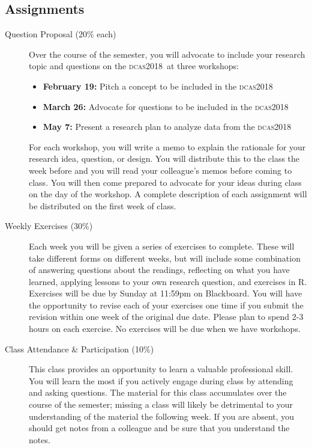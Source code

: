 \documentclass[11pt]{syllabus}
\newcommand{\R}{\textsf{R}}
\newcommand{\dcas}{\textsc{dcas2018}}
\begin{document}
\subsection{Assignments}
\begin{description}
\item[Question Proposal (20\% each)] Over the course of the semester, you will advocate to include your research topic and questions on the \dcas\ at three workshops: 
\begin{itemize}
\item \textbf{February 19:} Pitch a concept to be included in the \dcas
\item \textbf{March 26:} Advocate for questions to be included in the \dcas
\item \textbf{May 7:} Present a research plan to analyze data from the \dcas
\end{itemize}

For each workshop, you will write a memo to explain the rationale for your research idea, question, or design. You will distribute this to the class the week before and you will read your colleague's memos before coming to class. You will then come prepared to advocate for your ideas during class on the day of the workshop. A complete description of each assignment will be distributed on the first week of class. 

\item[Weekly Exercises (30\%)] Each week you will be given a series of exercises to complete. These will take different forms on different weeks, but will include some combination of answering questions about the readings, reflecting on what you have learned, applying lessons to your own research question, and exercises in \R. Exercises will be due by Sunday at 11:59pm on Blackboard. You will have the opportunity to revise each of your exercises one time if you submit the revision within one week of the original due date. Please plan to spend 2-3 hours on each exercise. No exercises will be due when we have workshops. 

\item[Class Attendance \& Participation (10\%)] This class provides an opportunity to learn a valuable professional skill. You will learn the most if you actively engage during class by attending and asking questions. The material for this class accumulates over the course of the semester; missing a class will likely be detrimental to your understanding of the material the following week. If you are absent, you should get notes from a colleague and be sure that you understand the notes. 
\end{description}
\end{document}
